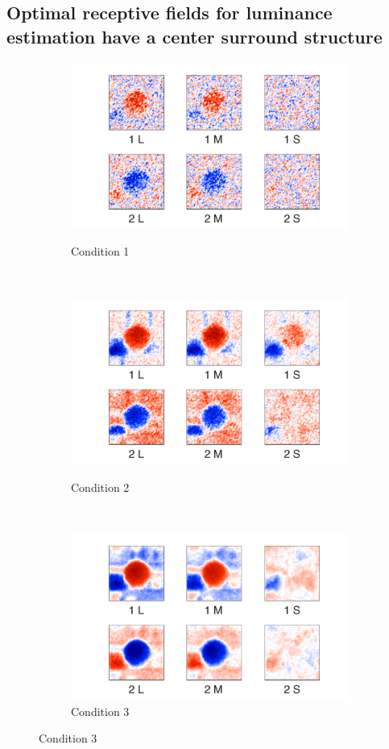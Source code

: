 \documentclass{jov}
\begin{document}
\subsection{Optimal receptive fields for luminance estimation have a center surround structure}
\begin{figure}
\centering
\begin{subfigure}{0.21 \textwidth}
	\caption{Condition 1}
	\includegraphics[width=\textwidth]{../Figures/Figure14/Figure14_a.pdf}
	\label{fig:case1Filter}
    \end{subfigure}
    ~ ~ ~
    \begin{subfigure}{0.21 \textwidth}   
	\caption{Condition 2}
	\includegraphics[width=\textwidth]{../Figures/Figure14/Figure14_b.pdf}
	\label{fig:case2Filter}
    \end{subfigure}
    ~ ~ ~
        \begin{subfigure}{0.21 \textwidth}
	\caption{Condition 3}
	\includegraphics[width=\textwidth]{../Figures/Figure14/Figure14_c.pdf}

\end{subfigure}
\end{figure}
\end{document}
